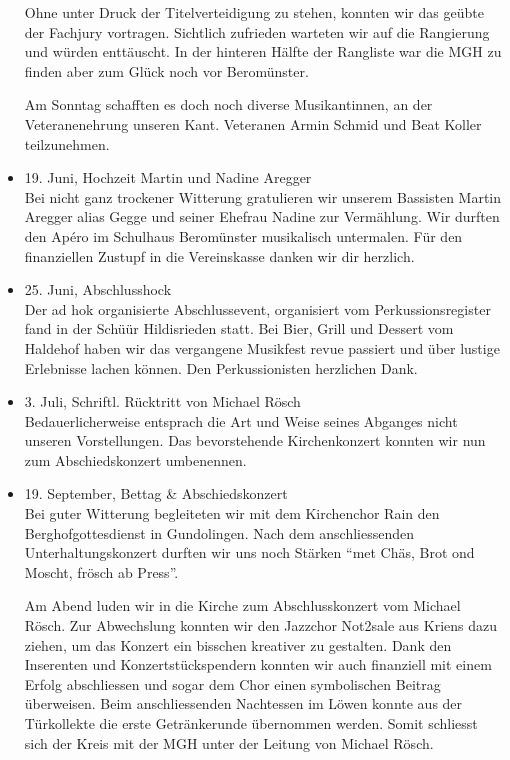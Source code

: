 \begin{history}
\begin{itemize}
              Ohne unter Druck der Titelverteidigung zu stehen, konnten wir das geübte
              der Fachjury vortragen. Sichtlich zufrieden warteten wir auf die
              Rangierung und würden enttäuscht. In der hinteren Hälfte der Rangliste
              war die MGH zu finden aber zum Glück noch vor Beromünster.

              Am Sonntag schafften es doch noch diverse Musikantinnen, an der
              Veteranenehrung unseren Kant. Veteranen Armin Schmid und Beat Koller
              teilzunehmen.

        \item 19. Juni, Hochzeit Martin und Nadine Aregger\\
              Bei nicht ganz trockener Witterung gratulieren wir unserem Bassisten
              Martin Aregger alias Gegge und seiner Ehefrau Nadine zur Vermählung. Wir
              durften den Apéro im Schulhaus Beromünster musikalisch untermalen. Für
              den finanziellen Zustupf in die Vereinskasse danken wir dir herzlich.

        \item 25. Juni, Abschlusshock\\
              Der ad hok organisierte Abschlussevent, organisiert vom
              Perkussionsregister fand in der Schüür Hildisrieden statt. Bei Bier,
              Grill und Dessert vom Haldehof haben wir das vergangene Musikfest revue
              passiert und über lustige Erlebnisse lachen können. Den Perkussionisten
              herzlichen Dank.

        \item 3. Juli, Schriftl. Rücktritt von Michael Rösch\\
              Bedauerlicherweise entsprach die Art und Weise
              seines Abganges nicht unseren Vorstellungen. Das bevorstehende
              Kirchenkonzert konnten wir nun zum Abschiedskonzert umbenennen.

        \item 19. September, Bettag \& Abschiedskonzert\\
              Bei guter Witterung begleiteten wir mit dem Kirchenchor Rain den
              Berghofgottesdienst in Gundolingen. Nach dem anschliessenden
              Unterhaltungskonzert durften wir uns noch Stärken \enquote{met Chäs, Brot ond
                  Moscht, frösch ab Press}.

              Am Abend luden wir in die Kirche zum Abschlusskonzert vom Michael Rösch.
              Zur Abwechslung konnten wir den Jazzchor Not2sale aus Kriens dazu
              ziehen, um das Konzert ein bisschen kreativer zu gestalten. Dank den
              Inserenten und Konzertstückspendern konnten wir auch finanziell mit einem
              Erfolg abschliessen und sogar dem Chor einen symbolischen Beitrag
              überweisen. Beim anschliessenden Nachtessen im Löwen konnte aus der
              Türkollekte die erste Getränkerunde übernommen werden. Somit schliesst
              sich der Kreis mit der MGH unter der Leitung von Michael Rösch.


\end{itemize}
\end{history}
